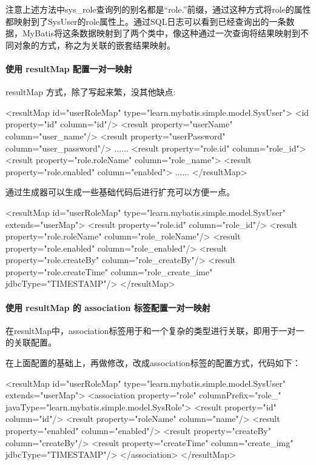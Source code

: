 注意上述方法中sys\_role查询列的别名都是“role.”前缀，通过这种方式将role的属性都映射到了SysUser的role属性上。通过SQL日志可以看到已经查询出的一条数据，MyBatis将这条数据映射到了两个类中，像这种通过一次查询将结果映射到不同对象的方式，称之为关联的嵌套结果映射。

\paragraph*{使用 resultMap 配置一对一映射}

resultMap 方式，除了写起来繁，没其他缺点:

\begin{xml}
<resultMap id="userRoleMap" type="learn.mybatis.simple.model.SysUser">
    <id property="id" column="id"/>
    <result property="userName" column="user_name"/>
    <result property="userPassword" column="user_password"/>
    ......
    <result property="role.id" column="role_id">
    <result property="role.roleName" column="role_name">
    <result property="role.enabled" column="enabled">
    ......
</resultMap>
\end{xml}

通过生成器可以生成一些基础代码后进行扩充可以方便一点。

\begin{xml}
<resultMap id="userRoleMap" type="learn.mybatis.simple.model.SysUser" extends="userMap">
    <result property="role.id" column="role_id"/>
    <result property="role.roleName" column="role_roleName"/>
    <result property="role.enabled" column="role_enabled"/>
    <result property="role.createBy" column="role_createBy"/>
    <result property="role.createTime" column="role_create_ime" jdbcType="TIMESTAMP"/>
</resultMap>
\end{xml}

\paragraph*{使用 resultMap 的 association 标签配置一对一映射}

在resultMap中，association标签用于和一个复杂的类型进行关联，即用于一对一的关联配置。

在上面配置的基础上，再做修改，改成association标签的配置方式，代码如下：

\begin{xml}
<resultMap id="userRoleMap" type="learn.mybatis.simple.model.SysUser" extends="userMap">
    <association property="role" columnPrefix="role_" javaType="learn.mybatis.simple.model.SysRole">
        <result property="id" column="id"/>
        <result property="roleName" column="name"/>
        <result property="enabled" column="enabled"/>
        <result property="createBy" column="createBy"/>
        <result property="createTime" column="create_img" jdbcType="TIMESTAMP"/>
    </association>
</resultMap>
\end{xml}

